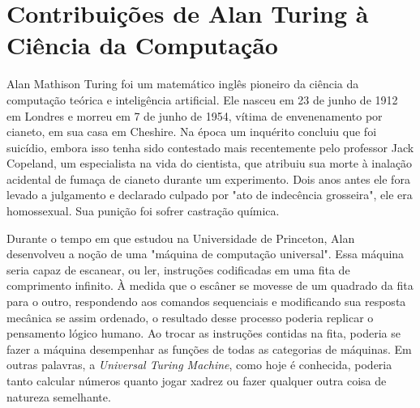 \documentclass[
  12pt,     %
  openright,      %
  oneside,      %
  a4paper,      %
  english,      %
  brazil        %
  ]{abntex2}
\begin{document}

\frenchspacing


\imprimircapa

\imprimirfolhaderosto

\section*{Contribuições de Alan Turing à Ciência da Computação}

Alan Mathison Turing foi um matemático inglês pioneiro da ciência da computação teórica e inteligência artificial. Ele nasceu em 23 de junho de 1912 em Londres e morreu em 7 de junho de 1954, vítima de envenenamento por cianeto, em sua casa em Cheshire. Na época um inquérito concluiu que foi suicídio, embora isso tenha sido contestado mais recentemente pelo professor Jack Copeland, um especialista na vida do cientista, que atribuiu sua morte à inalação acidental de fumaça de cianeto durante um experimento. Dois anos antes ele fora levado a julgamento e declarado culpado por "ato de indecência grosseira", ele era homossexual. Sua punição foi sofrer castração química.

Durante o tempo em que estudou na Universidade de Princeton, Alan desenvolveu a noção de uma "máquina de computação universal". Essa máquina seria capaz de escanear, ou ler, instruções codificadas em uma fita de comprimento infinito. À medida que o escâner se movesse de um quadrado da fita para o outro, respondendo aos comandos sequenciais e modificando sua resposta mecânica se assim ordenado, o resultado desse processo poderia replicar o pensamento lógico humano. Ao trocar as instruções contidas na fita, poderia se fazer a máquina desempenhar as funções de todas as categorias de máquinas. Em outras palavras, a \textit{Universal Turing Machine}, como hoje é conhecida, poderia tanto calcular números quanto jogar xadrez ou fazer qualquer outra coisa de natureza semelhante.
\end{document}
